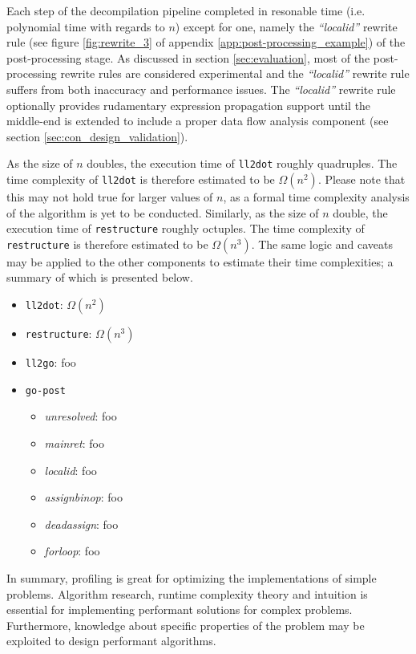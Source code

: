 Each step of the decompilation pipeline completed in resonable time (i.e. polynomial time with regards to $ n $) except for one, namely the \textit{``localid''} rewrite rule (see figure \ref{fig:rewrite_3} of appendix \ref{app:post-processing_example}) of the post-processing stage. As discussed in section \ref{sec:evaluation}, most of the post-processing rewrite rules are considered experimental and the \textit{``localid''} rewrite rule suffers from both inaccuracy and performance issues. The \textit{``localid''} rewrite rule optionally provides rudamentary expression propagation support until the middle-end is extended to include a proper data flow analysis component (see section \ref{sec:con_design_validation}).

As the size of $ n $ doubles, the execution time of \texttt{ll2dot} roughly quadruples. The time complexity of \texttt{ll2dot} is therefore estimated to be $ \Omega(n^{2}) $. Please note that this may not hold true for larger values of $ n $, as a formal time complexity analysis of the algorithm is yet to be conducted. Similarly, as the size of $ n $ double, the execution time of \texttt{restructure} roughly octuples. The time complexity of \texttt{restructure} is therefore estimated to be $ \Omega(n^{3}) $. The same logic and caveats may be applied to the other components to estimate their time complexities; a summary of which is presented below.


\begin{itemize}
	\item \texttt{ll2dot}: $ \Omega(n^{2}) $
	\item \texttt{restructure}: $ \Omega(n^{3}) $
	\item \texttt{ll2go}: foo
	\item \texttt{go-post}
	\begin{itemize}
		\item \textit{unresolved}: foo
		\item \textit{mainret}: foo
		\item \textit{localid}: foo
		\item \textit{assignbinop}: foo
		\item \textit{deadassign}: foo
		\item \textit{forloop}: foo
	\end{itemize}
\end{itemize}

In summary, profiling is great for optimizing the implementations of simple problems. Algorithm research, runtime complexity theory and intuition is essential for implementing performant solutions for complex problems. Furthermore, knowledge about specific properties of the problem may be exploited to design performant algorithms.





